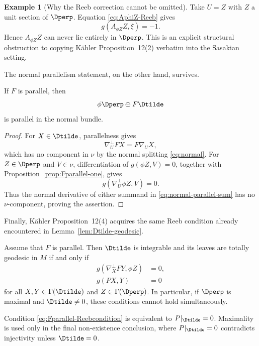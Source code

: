 \documentclass[11pt]{article}
\theoremstyle{definition}\newtheorem{definition}[theorem]{Definition}\newtheorem{example}[theorem]{Example}
\theoremstyle{remark}\newtheorem{remark}[theorem]{Remark}
\begin{document}
\begin{example}[Why the Reeb correction cannot be omitted]\label{ex:Fparallel-Reebshape}
Take $U=Z$ with $Z$ a unit section of $\Dperp$.  Equation \eqref{eq:AphiZ-Reeb} gives
\[
 g(A_{\phi Z}Z,\xi)=-1.
\]
Hence $A_{\phi Z}Z$ can never lie entirely in $\Dperp$.  This is an explicit structural obstruction to copying K\"ahler Proposition~12(2) verbatim into the Sasakian setting.
\end{example}

The normal parallelism statement, on the other hand, survives.

\begin{proposition}\label{prop:normal-parallel-F}
If $F$ is parallel, then
\begin{equation}\label{eq:normal-parallel-sum}
 \phi\Dperp\oplus F\Dtilde
\end{equation}
is parallel in the normal bundle.
\end{proposition}
\begin{proof}
For $X\in\Dtilde$, parallelness gives
\[
 \nabla_U^\perp FX=F\nabla_UX,
\]
which has no component in $\nu$ by the normal splitting \eqref{eq:normal}.  For $Z\in\Dperp$ and $V\in\nu$, differentiation of $g(\phi Z,V)=0$, together with Proposition~\ref{prop:Fparallel-one}, gives
\[
 g(\nabla_U^\perp\phi Z,V)=0.
\]
Thus the normal derivative of either summand in \eqref{eq:normal-parallel-sum} has no $\nu$-component, proving the assertion.
\end{proof}



Finally, K\"ahler Proposition~12(4) acquires the same Reeb condition already encountered in Lemma~\ref{lem:Dtilde-geodesic}.

\begin{proposition}
\label{prop:Fparallel-ambiguous}
Assume that \(F\) is parallel.  Then \(\Dtilde\) is integrable and its
leaves are totally geodesic in \(M\) if and only if
\begin{align}
 g(\nabla_X^\perp FY,\phi Z)&=0,
 \label{eq:Fparallel-normal-min}\\
 g(PX,Y)&=0
 \label{eq:Fparallel-Reebcondition}
\end{align}
for all \(X,Y\in\Gamma(\Dtilde)\) and
\(Z\in\Gamma(\Dperp)\).  In particular, if \(\Dperp\) is maximal and
\(\Dtilde\ne0\), these conditions cannot hold simultaneously.

Condition \eqref{eq:Fparallel-Reebcondition} is equivalent to
\(P|_{\Dtilde}=0\).  Maximality is used only in the final non-existence
conclusion, where \(P|_{\Dtilde}=0\) contradicts injectivity unless
\(\Dtilde=0\).
\end{proposition}
\end{document}
